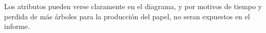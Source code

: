 Los atributos pueden verse claramente en el diagrama, y por motivos de tiempo y perdida de m\'as \'arboles para la producci\'on del papel, no seran expuestos en el informe.

